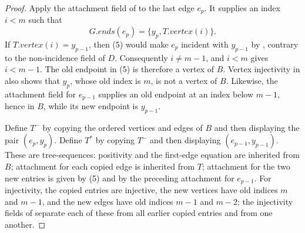 \begin{proof}
Apply the attachment field of  to the last edge
\(e_p\).  It supplies an index \(i<m\) such that
\[
       G.\mathit{ends}(e_p)=\{y_p,T.\mathit{vertex}(i)\}.     \tag{5}
\]
If \(T.\mathit{vertex}(i)=y_{p-1}\), then (5) would make \(e_p\)
incident with \(y_{p-1}\) by , contrary to the
non-incidence field of \(D\).
Consequently \(i\ne m-1\), and \(i<m\) gives \(i<m-1\).  The old endpoint
in (5) is therefore a vertex of \(B\).  Vertex injectivity in
 also shows that \(y_p\), whose old index is \(m\),
is not a vertex of \(B\).  Likewise, the attachment field for
\(e_{p-1}\) supplies an old endpoint at an index below \(m-1\), hence in
\(B\), while its new endpoint is \(y_{p-1}\).

Define \(T^-\) by copying the ordered vertices and edges of \(B\) and
then displaying the pair \((e_p,y_p)\).  Define \(T^*\) by copying
\(T^-\) and then displaying \((e_{p-1},y_{p-1})\).  These are
tree-sequences: positivity and the first-edge equation are inherited from
\(B\); attachment for each copied edge is inherited from \(T\); attachment
for the two new entries is given by (5) and by the preceding attachment
for \(e_{p-1}\).  For injectivity, the copied entries are injective, the
new vertices have old indices \(m\) and \(m-1\), and the new edges have old
indices \(m-1\) and \(m-2\); the injectivity fields of
 separate each of these from all earlier copied
entries and from one another.


\end{proof}
